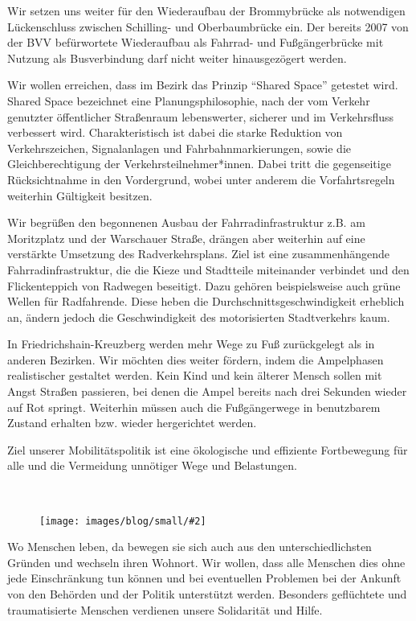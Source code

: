 \documentclass[a4paper,10pt]{article}
\newcommand{\mysection}[1]{{\vspace{1cm}\noindent\color{gray}{\ttfamily\LARGE\raggedright #1}\\\medskip}}
\newcommand{\abschnitt}[2]{%
\mysection{\raggedright #1}%
\begin{figure}[t]%
\vspace*{-2.7cm}%
\hspace*{-2.1cm}%
\texttt{[image: images/blog/small/\#2]} %
\end{figure}%
}
\begin{document}
Wir setzen uns weiter für den Wiederaufbau der Brommybrücke als
notwendigen Lückenschluss zwischen Schilling- und Oberbaumbrücke ein.
Der bereits 2007 von der BVV befürwortete Wiederaufbau als Fahrrad- und
Fußgängerbrücke mit Nutzung als Busverbindung darf nicht weiter
hinausgezögert werden.

Wir wollen erreichen, dass im Bezirk das Prinzip ``Shared Space''
getestet wird. Shared Space bezeichnet eine Planungsphilosophie, nach
der vom Verkehr genutzter öffentlicher Straßenraum lebenswerter,
sicherer und im Verkehrsfluss verbessert wird. Charakteristisch ist
dabei die starke Reduktion von Verkehrszeichen, Signalanlagen und
Fahrbahnmarkierungen, sowie die Gleichberechtigung der
Verkehrsteilnehmer*innen. Dabei tritt die gegenseitige Rücksichtnahme in
den Vordergrund, wobei unter anderem die Vorfahrtsregeln weiterhin
Gültigkeit besitzen.

Wir begrüßen den begonnenen Ausbau der Fahrradinfrastruktur z.B. am
Moritzplatz und der Warschauer Straße, drängen aber weiterhin auf eine
verstärkte Umsetzung des Radverkehrsplans. Ziel ist eine
zusammenhängende Fahrradinfrastruktur, die die Kieze und Stadtteile
miteinander verbindet und den Flickenteppich von Radwegen beseitigt.
Dazu gehören beispielsweise auch grüne Wellen für Radfahrende. Diese
heben die Durchschnittsgeschwindigkeit erheblich an, ändern jedoch die
Geschwindigkeit des motorisierten Stadtverkehrs kaum.


\enlargethispage{2em}
In Friedrichshain-Kreuzberg werden mehr Wege zu Fuß zurückgelegt als in
anderen Bezirken. Wir möchten dies weiter fördern, indem die Ampelphasen
realistischer gestaltet werden. Kein Kind und kein älterer Mensch sollen
mit Angst Straßen passieren, bei denen die Ampel bereits nach drei
Sekunden wieder auf Rot springt. Weiterhin müssen auch die Fußgängerwege
in benutzbarem Zustand erhalten bzw. wieder hergerichtet werden.

Ziel unserer Mobilitätspolitik ist eine ökologische und effiziente
Fortbewegung für alle und die Vermeidung unnötiger Wege und Belastungen.

\clearpage
\abschnitt{Migration}{plakat_gcar}

Wo Menschen leben, da bewegen sie sich auch aus den unterschiedlichsten
Gründen und wechseln ihren Wohnort. Wir wollen, dass alle Menschen dies
ohne jede Einschränkung tun können und bei eventuellen Problemen bei der
Ankunft von den Behörden und der Politik unterstützt werden. Besonders
geflüchtete und traumatisierte Menschen verdienen unsere Solidarität und
Hilfe.
\end{document}
